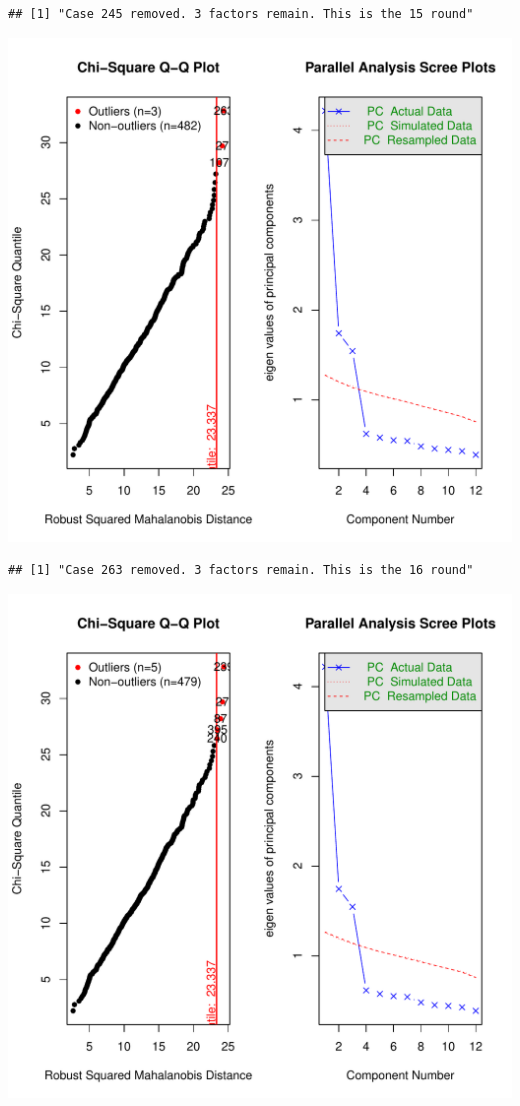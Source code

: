 \documentclass{article}\usepackage[]{graphicx}\usepackage[]{color}
\makeatletter
\def\maxwidth{ %
  \ifdim\Gin@nat@width>\linewidth
    \linewidth
  \else
    \Gin@nat@width
  \fi
}
\newenvironment{kframe}{%
 \def\at@end@of@kframe{}%
 \ifinner\ifhmode%
  \def\at@end@of@kframe{\end{minipage}}%
  \begin{minipage}{\columnwidth}%
 \fi\fi%
 \def\FrameCommand##1{\hskip\@totalleftmargin \hskip-\fboxsep
 \colorbox{shadecolor}{##1}\hskip-\fboxsep
     \hskip-\linewidth \hskip-\@totalleftmargin \hskip\columnwidth}%
 \MakeFramed {\advance\hsize-\width
   \@totalleftmargin\z@ \linewidth\hsize
   \@setminipage}}%
 {\par\unskip\endMakeFramed%
 \at@end@of@kframe}
\newenvironment{knitrout}{}{} %
\makeatother
\begin{document}
\begin{knitrout}
\begin{kframe}\begin{verbatim}
## [1] "Case 245 removed. 3 factors remain. This is the 15 round"
\end{verbatim}
\end{kframe}
\includegraphics[width=\maxwidth]{figure/unnamed-chunk-10-16} 
\begin{kframe}\begin{verbatim}
## [1] "Case 263 removed. 3 factors remain. This is the 16 round"
\end{verbatim}
\end{kframe}
\includegraphics[width=\maxwidth]{figure/unnamed-chunk-10-17} 

\end{knitrout}
\end{document}
